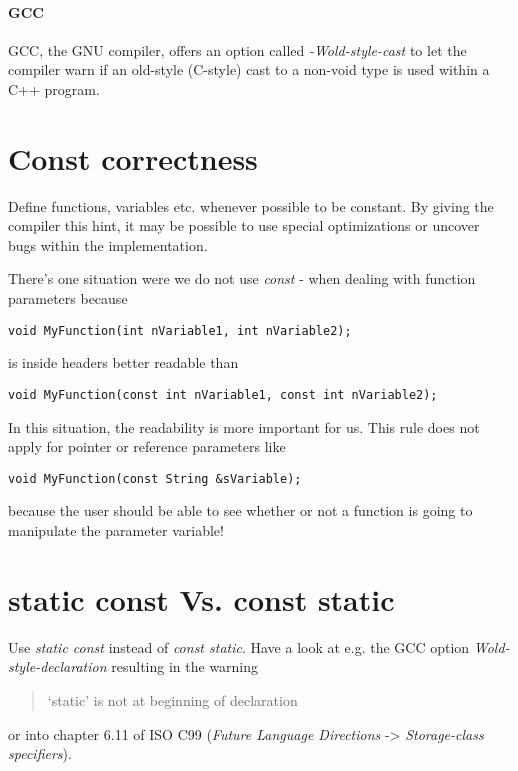 \paragraph{GCC}
GCC, the GNU compiler, offers an option called \emph{-Wold-style-cast} to let the compiler warn if an old-style (C-style) cast to a non-void type is used within a C++ program.




\section{Const correctness}
Define functions, variables etc. whenever possible to be constant. By giving the compiler this hint, it may be possible to use special optimizations or uncover bugs within the implementation.

There's one situation were we do not use \emph{const} - when dealing with function parameters because

\begin{lstlisting}[caption=Function parameters]
void MyFunction(int nVariable1, int nVariable2);
\end{lstlisting}

is inside headers better readable than

\begin{lstlisting}[caption=Constant function parameters]
void MyFunction(const int nVariable1, const int nVariable2);
\end{lstlisting}

In this situation, the readability is more important for us. This rule does not apply for pointer or reference parameters like

\begin{lstlisting}[caption=Constant function pointer/reference parameter]
void MyFunction(const String &sVariable);
\end{lstlisting}

because the user should be able to see whether or not a function is going to manipulate the parameter variable!




\section{static const Vs. const static}
Use \emph{static const} instead of \emph{const static}. Have a look at e.g. the GCC option \emph{Wold-style-declaration} resulting in the warning \begin{quote}`static' is not at beginning of declaration\end{quote} or into chapter 6.11 of ISO C99 (\emph{Future Language Directions} -> \emph{Storage-class specifiers}).





